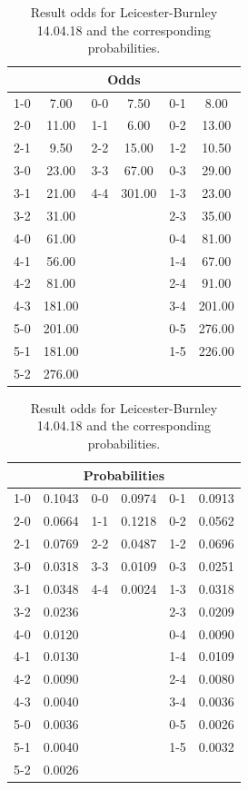 \begin{table}[H]
\begin{subtable}{1\textwidth}
\centering
\begin{tabular}{|lc|lc|lc|}
\multicolumn{6}{c}{Odds}                   \\
\hline
1-0 & 7.00 \Tstrut   & 0-0 & 7.50   & 0-1 & 8.00   \\
2-0 & 11.00  & 1-1 & 6.00   & 0-2 & 13.00  \\
2-1 & 9.50   & 2-2 & 15.00  & 1-2 & 10.50  \\
3-0 & 23.00  & 3-3 & 67.00  & 0-3 & 29.00  \\
3-1 & 21.00  & 4-4 & 301.00 & 1-3 & 23.00  \\
3-2 & 31.00  &     &        & 2-3 & 35.00  \\
4-0 & 61.00  &     &        & 0-4 & 81.00  \\
4-1 & 56.00  &     &        & 1-4 & 67.00  \\
4-2 & 81.00  &     &        & 2-4 & 91.00  \\
4-3 & 181.00 &     &        & 3-4 & 201.00 \\
5-0 & 201.00 &     &        & 0-5 & 276.00 \\
5-1 & 181.00 &     &        & 1-5 & 226.00 \\
5-2 & 276.00 \Bstrut  &     &        &     &        \\
\hline
\end{tabular}
\end{subtable}
\bigskip
\begin{subtable}{1\textwidth}
\centering
\begin{tabular}{|ll|ll|ll|}
\multicolumn{6}{c}{Probabilities}                         \\
\hline
1-0 \Tstrut  & 0.1043 & 0-0 & 0.0974 & 0-1 & 0.0913  \\
2-0 & 0.0664 & 1-1 & 0.1218 & 0-2 & 0.0562 \\
2-1 & 0.0769 & 2-2 & 0.0487 & 1-2 & 0.0696 \\
3-0 & 0.0318  & 3-3 & 0.0109 & 0-3 & 0.0251 \\
3-1 & 0.0348 & 4-4 & 0.0024 & 1-3 & 0.0318  \\
3-2 & 0.0236 &     &          & 2-3 & 0.0209 \\
4-0 & 0.0120 &     &          & 0-4 & 0.0090 \\
4-1 & 0.0130 &     &          & 1-4 & 0.0109 \\
4-2 & 0.0090 &     &          & 2-4 & 0.0080  \\
4-3 & 0.0040 &     &          & 3-4 & 0.0036 \\
5-0 & 0.0036 &     &          & 0-5 & 0.0026 \\
5-1 & 0.0040 &     &          & 1-5 & 0.0032 \\
5-2 \Bstrut  & 0.0026 &     &          &     &         \\
\hline
\end{tabular}
\end{subtable}
\caption{Result odds for Leicester-Burnley 14.04.18 and the corresponding probabilities.}
\label{tab:odds_probabilities}
\end{table}



